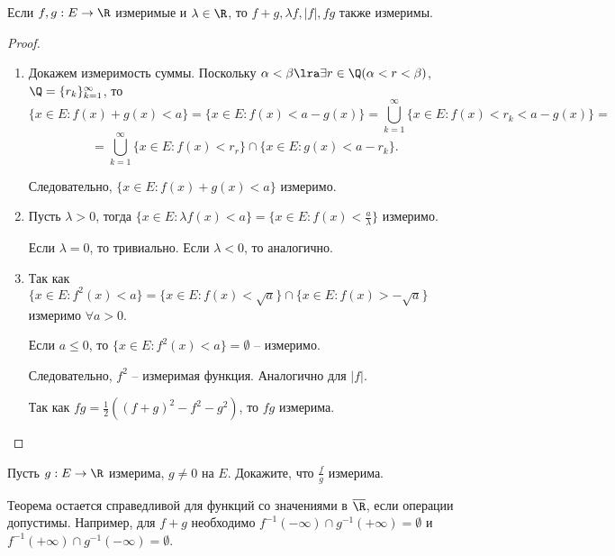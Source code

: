 \begin{theorem}
    Если $f, g: E \to \R$ измеримые и $\lambda \in \R$, то $f + g, \lambda f, |f|, fg$ также измеримы.
\end{theorem}

\begin{proof}
    \begin{enumerate}
        \item Докажем измеримость суммы. Поскольку $\alpha < \beta \lra \exists r \in \Q (\alpha < r < \beta)$, $\Q = \{r_{k}\}_{k = 1}^{\infty}$, то 
        \[\{x \in E: f(x) + g(x) < a\} = \{x \in E: f(x) < a - g(x)\} = \bigcup_{k = 1}^{\infty}\{x \in E: f(x) < r_{k} < a - g(x)\} = \]
        \[= \bigcup_{k = 1}^{\infty}\{x \in E: f(x) < r_{r}\} \cap \{x \in E: g(x) < a - r_{k}\}.\]
    
        Следовательно, $\{x \in E: f(x) + g(x) < a\}$ измеримо.

        \item Пусть $\lambda > 0$, тогда $\{x \in E: \lambda f(x) < a\} = \{x \in E: f(x) < \frac{a}{\lambda}\}$ измеримо.
    
        Если $\lambda = 0$, то тривиально. Если $\lambda < 0$, то аналогично.

        \item Так как $\{x \in E: f^{2}(x) < a\} = \{x \in E: f(x) < \sqrt{a}\} \cap \{x \in E: f(x) > -\sqrt{a}\}$ измеримо $\forall a > 0$.
    
        Если $a \leq 0$, то $\{x \in E: f^{2}(x) < a\} = \emptyset$ -- измеримо.
    
        Следовательно, $f^{2}$ -- измеримая функция. Аналогично для $|f|$.
    
        Так как $fg = \frac{1}{2}\left((f + g)^{2} - f^{2} - g^{2}\right)$, то $fg$ измерима.
    \end{enumerate}
\end{proof}

\begin{problem}
    Пусть $g: E \to \R$ измерима, $g \neq 0$ на $E$. Докажите, что $\frac{f}{g}$ измерима.
\end{problem}

\begin{note}
    Теорема остается справедливой для функций со значениями в $\overline{\R}$, если операции допустимы. Например, для $f + g$ необходимо $f^{-1}(-\infty) \cap g^{-1}(+\infty) = \emptyset$ и $f^{-1}(+\infty) \cap g^{-1}(-\infty) = \emptyset$.
\end{note}